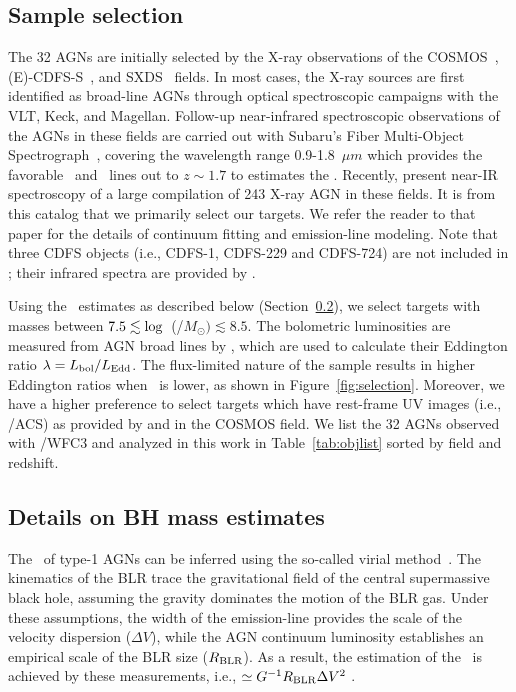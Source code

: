 \documentclass[apj]{emulateapj}
\begin{document}
\subsection{Sample selection}\label{sec:target_selection}

The 32 AGNs are initially selected by the X-ray observations of the COSMOS~\citep{Civano2016}, (E)-CDFS-S~\citep{Lehmer2005, Xue2011}, and SXDS~\citep{Ueda2008} fields. In most cases, the X-ray sources are first identified as broad-line AGNs through optical spectroscopic campaigns with the VLT, Keck, and Magellan. Follow-up near-infrared spectroscopic observations of the AGNs in these fields are carried out with Subaru's Fiber Multi-Object Spectrograph~\citep[FMOS, ][]{Kimura2010, Nobuta2012,Matsuoka2013}, covering the wavelength range 0.9-1.8~$\mu m$ which provides the favorable \halpha\ and \hbeta\ lines out to $z\sim1.7$ to estimates the \mbh. Recently, \citet{Schulze2018} present near-IR spectroscopy of a large compilation of 243 X-ray AGN in these fields. It is from this catalog that we primarily select our targets. We refer the reader to that paper for the details of continuum fitting and emission-line modeling. Note that three CDFS objects (i.e., CDFS-1, CDFS-229 and CDFS-724) are not included in \citet{Schulze2018}; their infrared spectra are provided by \citet{Suh2015}.

Using the \mbh\ estimates as described below (Section~\ref{mbh}), we select targets with masses between $7.5 \lesssim {\rm log}$~(\mbh/$M_{\odot})\lesssim8.5$. The bolometric luminosities are measured from AGN broad lines by \citet[][Section 3.3]{Schulze2018}, which are used to calculate their Eddington ratio $\lambda = L_{\rm bol}/L_{\rm Edd}$. The flux-limited nature of the sample results in higher Eddington ratios when \mbh\ is lower, as shown in Figure~\ref{fig:selection}. Moreover, we have a higher preference to select targets which have rest-frame UV images (i.e., \hst/ACS) as provided by \citet{Scoville2007} and \citet{Koekemoer2007} in the COSMOS field. We list the 32 AGNs observed with \hst/WFC3 and analyzed in this work in Table~\ref{tab:objlist} sorted by field and redshift.




\subsection{Details on BH mass estimates}
\label{mbh}

The \mbh\ of type-1 AGNs can be inferred using the so-called virial method~\citep{Peterson2004, Shen2013}. The kinematics of the BLR trace the gravitational field of the central supermassive black hole, assuming the gravity dominates the motion of the BLR gas. Under these assumptions, the width of the emission-line provides the scale of the velocity dispersion ($\Delta V$), while the AGN continuum luminosity establishes an empirical scale of the BLR size ($R_{\rm BLR}$). As a result, the estimation of the \mbh\ is achieved by these measurements, i.e., \mbh$\simeq G^{-1} R_{\rm BLR} \Delta V^2$ \citep{McLure2004}.
\end{document}
